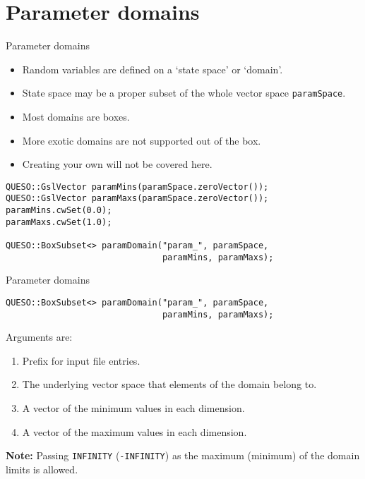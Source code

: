 \section{Parameter domains}
\begin{frame}[fragile]{Parameter domains}
  \begin{itemize}
    \item Random variables are defined on a `state space' or `domain'.
    \item State space may be a proper subset of the whole vector space
      \texttt{paramSpace}.
    \item Most domains are boxes.
    \item More exotic domains are not supported out of the box.
    \item Creating your own will not be covered here.
  \end{itemize}
  \begin{verbatim}
QUESO::GslVector paramMins(paramSpace.zeroVector());
QUESO::GslVector paramMaxs(paramSpace.zeroVector());
paramMins.cwSet(0.0);
paramMaxs.cwSet(1.0);

QUESO::BoxSubset<> paramDomain("param_", paramSpace,
                               paramMins, paramMaxs);
  \end{verbatim}
\end{frame}

\begin{frame}[fragile]{Parameter domains}
  \begin{verbatim}
QUESO::BoxSubset<> paramDomain("param_", paramSpace,
                               paramMins, paramMaxs);
  \end{verbatim}
  Arguments are:
  \begin{enumerate}
    \item Prefix for input file entries.
    \item The underlying vector space that elements of the domain belong to.
    \item A vector of the minimum values in each dimension.
    \item A vector of the maximum values in each dimension.
  \end{enumerate}
  \textbf{Note:} Passing \texttt{INFINITY} (\texttt{-INFINITY}) as the maximum
  (minimum) of the domain limits is allowed.
\end{frame}

